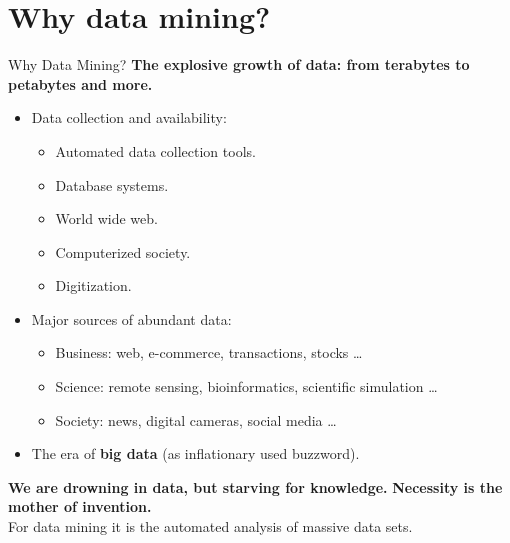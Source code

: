 \section{Why data mining?}

\begin{frame}{Why Data Mining?}
	\textbf{The explosive growth of data: from terabytes to petabytes and 
	more.}\\
	\begin{itemize}
		\item Data collection and availability:
		\begin{itemize}
			\item Automated data collection tools.
			\item Database systems.
			\item World wide web.
			\item Computerized society.
			\item Digitization.
		\end{itemize}
		\item Major sources of abundant data:
		\begin{itemize}
			\item Business: web, e-commerce, transactions, stocks \ldots
			\item Science: remote sensing, bioinformatics, scientific 
			simulation \ldots
			\item Society: news, digital cameras, social media \ldots
		\end{itemize}
		\item The era of \textbf{big data} (as inflationary used buzzword).
	\end{itemize}
	\textbf{We are drowning in data, but starving for knowledge.} 
	\textbf{Necessity is the mother of invention.}\\
	For data mining it is the automated analysis of massive data sets.
\end{frame}

